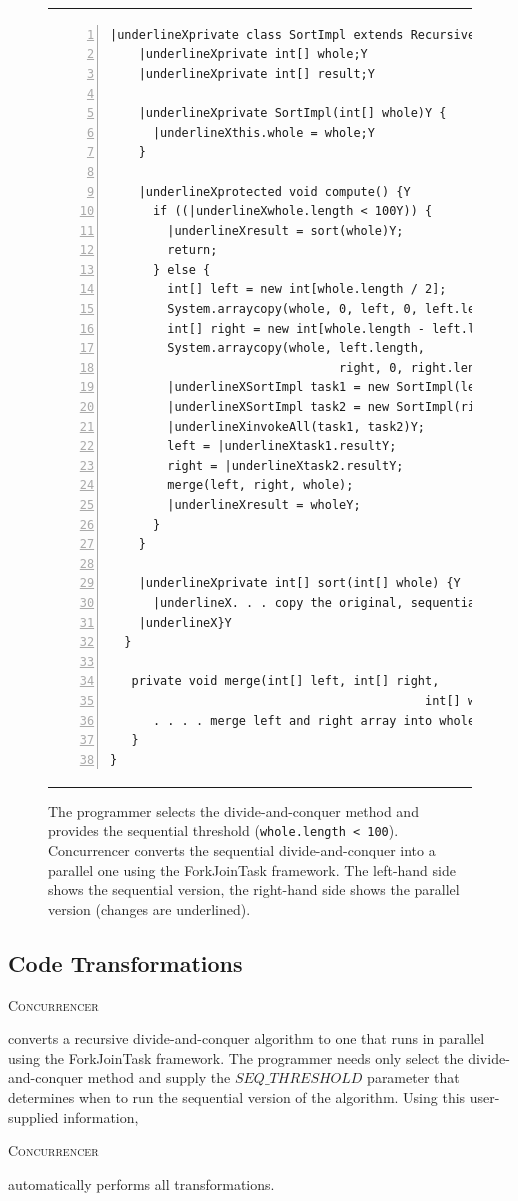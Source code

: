 \documentclass[10pt,twocolumn]{article}
\newcommand{\tool}{\begin{scriptsize}\textsc{Concurrencer}\end{scriptsize}\xspace}
\newenvironment{CodeOut}{\begin{scriptsize}}{\end{scriptsize}}
\newcommand{\MaxWidth}{\columnwidth}
\begin{document}
\begin{figure}[t]
\begin{CodeOut}
\begin{tabular}{@{}l|l@{}}
\begin{minipage}[t]{\MaxWidth}
\begin{Verbatim}[numbers=left, numbersep=6pt, commandchars=\|XY]
  |underlineXprivate class SortImpl extends RecursiveAction {Y
    |underlineXprivate int[] whole;Y
    |underlineXprivate int[] result;Y
		
    |underlineXprivate SortImpl(int[] whole)Y {
      |underlineXthis.whole = whole;Y
    }

    |underlineXprotected void compute() {Y
      if ((|underlineXwhole.length < 100Y)) {
        |underlineXresult = sort(whole)Y;
        return;
      } else {
        int[] left = new int[whole.length / 2];
        System.arraycopy(whole, 0, left, 0, left.length);
        int[] right = new int[whole.length - left.length];
        System.arraycopy(whole, left.length, 
                                right, 0, right.length);
        |underlineXSortImpl task1 = new SortImpl(left)Y;
        |underlineXSortImpl task2 = new SortImpl(right)Y;
        |underlineXinvokeAll(task1, task2)Y;
        left = |underlineXtask1.resultY;
        right = |underlineXtask2.resultY;
        merge(left, right, whole);
        |underlineXresult = wholeY;
      }
    }

    |underlineXprivate int[] sort(int[] whole) {Y
      |underlineX. . . copy the original, sequential implementationY
    |underlineX}Y
  }

   private void merge(int[] left, int[] right, 
                                            int[] whole) {
      . . . . merge left and right array into whole array
   } 
}
\end{Verbatim}
\end{minipage}
\end{tabular}
\end{CodeOut}
\caption{The programmer selects the divide-and-conquer method and provides the sequential threshold (\texttt{whole.length < 100}). 
Concurrencer converts the sequential divide-and-conquer into a parallel one using the ForkJoinTask framework. The left-hand side shows the
sequential version, the right-hand side shows the parallel version (changes are underlined).}
\label{fig:MergeSort}
\end{figure}


\subsection{Code Transformations}

\tool converts a recursive divide-and-conquer algorithm to one that runs in
parallel using the ForkJoinTask framework. The programmer needs only
select the divide-and-conquer method and supply the $\mathit{SEQ\_THRESHOLD}$
parameter that determines when to run the sequential version of the 
algorithm. Using this user-supplied information, \tool automatically performs
all transformations.
\end{document}
